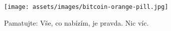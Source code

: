 \begin{figure}
  \texttt{[image: assets/images/bitcoin-orange-pill.jpg]}
  \caption*{Pamatujte: Vše, co nabízím, je pravda. Nic víc.}
  \label{fig:bitcoin-orange-pill}
\end{figure}

%
%
%
